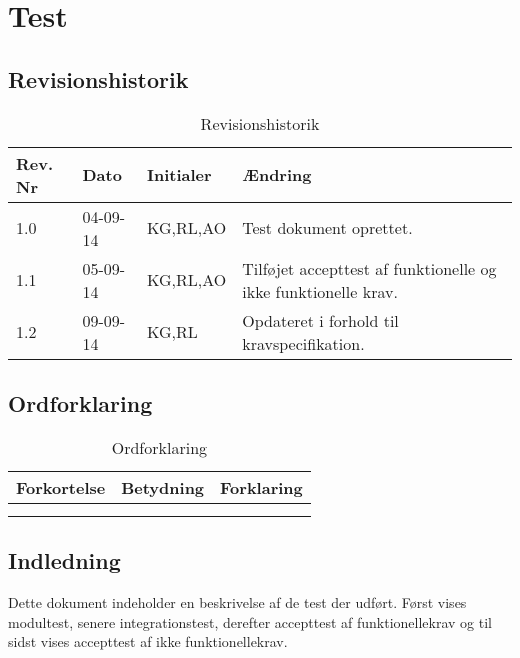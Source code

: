 \chapter{Test}

\section{Revisionshistorik}

\begin{table}[H]
	\centering
		\begin{tabular}{|p{2 cm}|p{2 cm}|p{3 cm}|p{6 cm}|} 
		\hline
			\textbf{Rev. Nr} & \textbf{Dato}		& \textbf{Initialer} 	& \textbf{Ændring} \\ \hline
			1.0 	& 04-09-14	& KG,RL,AO		& Test dokument oprettet.	\\ \hline
			1.1 	& 05-09-14	& KG,RL,AO		& Tilføjet accepttest af funktionelle og ikke funktionelle krav.\\ \hline
			1.2 	& 09-09-14	& KG,RL			& Opdateret i forhold til kravspecifikation.	\\ \hline
		\end{tabular}
	\caption{Revisionshistorik}
\end{table}

\section{Ordforklaring}


\begin{table}[H]
	\centering
		\begin{tabular}{|p{2.5cm}|p{4.5 cm}|p{6.5 cm}|}  
		\hline
			\textbf{Forkortelse} & \textbf{Betydning} & \textbf{Forklaring} \\ \hline
			& & \\ \hline
			& & \\ \hline
		\end{tabular}
	\caption{Ordforklaring}
\end{table}

\vspace{5cm}

\section{Indledning}

Dette dokument indeholder en beskrivelse af de test der udført. Først vises modultest, senere integrationstest, derefter accepttest af funktionellekrav og til sidst vises accepttest af ikke funktionellekrav.